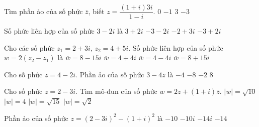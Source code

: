 \begin{ex}%
	Tìm phần ảo của số phức $\overline{z}$, biết $z=\dfrac{(1+i)3i}{1-i}$.
	\choice
	{\True $0$}
	{$-1$}
	{$3$}
	{$-3$}
\end{ex}

\begin{ex}%
	Số phức liên hợp của số phức $3-2i$ là
	\choice
	{\True $3+2i$}
	{$-3-2i$}
	{$-2+3i$}
	{$-3+2i$}
\end{ex}

\begin{ex}%
	Cho các số phức $z_1=2+3i$, $z_2=4+5i$. Số phức liên hợp của số phức $w=2(z_2-z_1)$ là
	\choice
	{$\overline{w}=8-15i$}
	{$\overline{w}=4+4i$}
	{\True $\overline{w}=4-4i$}
	{$\overline{w}=8+15i$}
\end{ex}

\begin{ex}%
	Cho số phức $z=4-2i$. Phần ảo của số phức $3-4z$ là
	\choice
	{$-4$}
	{$-8$}
	{$-2$}
	{\True $8$}
\end{ex}

\begin{ex}%
	Cho số phức $z=2-3i$. Tìm mô-đun của số phức $w=2z+(1+i)\overline{z}$.
	\choice
	{\True $| w|=\sqrt{10}$}
	{$| w|=4$}
	{$| w|=\sqrt{15}$}
	{$| w|=\sqrt{2}$}
\end{ex}

\begin{ex}%
	Phần ảo của số phức $z=(2-3i)^2-(1+i)^2$ là
	\choice
	{$-10$}
	{$-10i$}
	{$-14i$}
	{\True $-14$}
\end{ex}

